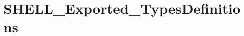 \hypertarget{group___s_h_e_l_l___exported___types_definitions}{}\section{S\+H\+E\+L\+L\+\_\+\+Exported\+\_\+\+Types\+Definitions}
\label{group___s_h_e_l_l___exported___types_definitions}
